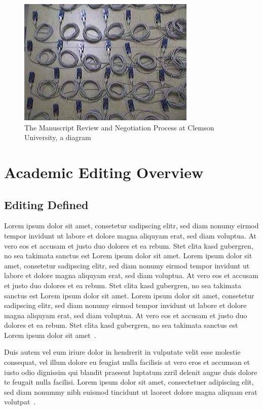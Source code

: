 \begin{figure}
\begin{center}
\includegraphics{testbed}
\caption[The Manuscript Review and Negotiation Process at Clemson \newline
University, a diagram]{The Manuscript Review and Negotiation Process at
Clemson University, a diagram}
\end{center}
\end{figure}


\section{Academic Editing Overview}
\subsection{Editing Defined}
Lorem ipsum dolor sit amet, consetetur sadipscing elitr,  sed diam nonumy eirmod
tempor invidunt ut labore et dolore magna aliquyam erat, sed diam voluptua. At
vero eos et accusam et justo duo dolores et ea rebum. Stet clita kasd gubergren,
no sea takimata sanctus est Lorem ipsum dolor sit amet. Lorem ipsum dolor sit
amet, consetetur sadipscing elitr,  sed diam nonumy eirmod tempor invidunt ut
labore et dolore magna aliquyam erat, sed diam voluptua. At vero eos et accusam
et justo duo dolores et ea rebum. Stet clita kasd gubergren, no sea takimata
sanctus est Lorem ipsum dolor sit amet. Lorem ipsum dolor sit amet, consetetur
sadipscing elitr,  sed diam nonumy eirmod tempor invidunt ut labore et dolore
magna aliquyam erat, sed diam voluptua. At vero eos et accusam et justo duo
dolores et ea rebum. Stet clita kasd gubergren, no sea takimata sanctus est
Lorem ipsum dolor sit amet~\cite{comp:usbsr}.

Duis autem vel eum iriure dolor in hendrerit in vulputate velit esse molestie
consequat, vel illum dolore eu feugiat nulla facilisis at vero eros et accumsan
et iusto odio dignissim qui blandit praesent luptatum zzril delenit augue duis
dolore te feugait nulla facilisi. Lorem ipsum dolor sit amet, consectetuer
adipiscing elit, sed diam nonummy nibh euismod tincidunt ut laoreet dolore
magna aliquam erat volutpat~\cite{cti:m2d}.

